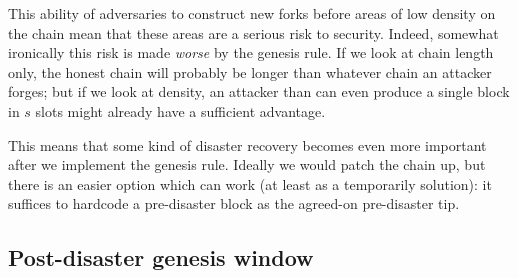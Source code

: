 \pagebreak

This ability of adversaries to construct new forks before areas of low density
on the chain mean that these areas are a serious risk to security. Indeed,
somewhat ironically this risk is made \emph{worse} by the genesis rule. If we
look at chain length only, the honest chain will probably be longer than
whatever chain an attacker forges; but if we look at density, an attacker than
can even produce a single block in $s$ slots might already have a sufficient
advantage.

This means that some kind of disaster recovery becomes even more important
after we implement the genesis rule. Ideally we would patch the chain up,
but there is an easier option which can work (at least as a temporarily
solution): it suffices to hardcode a pre-disaster block as the agreed-on
pre-disaster tip.

\subsection{Post-disaster genesis window}

